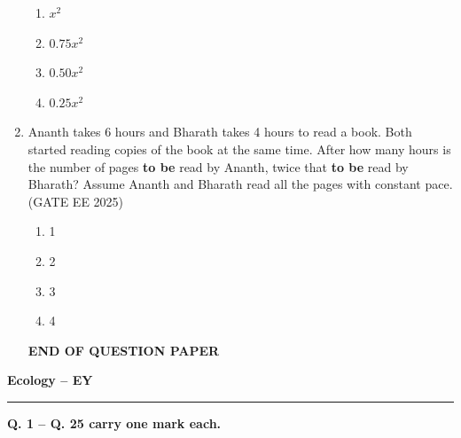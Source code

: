 \begin{enumerate}[leftmargin=*,label=\textbf{Q.\arabic*},resume]
\begin{multicols}{2}
\begin{enumerate}
\item $x^2$
\item $0.75 x^2$
\item $0.50 x^2$
\item $0.25 x^2$
\end{enumerate}
\end{multicols}

\item Ananth takes 6 hours and Bharath takes 4 hours to read a book. Both started reading copies of the book at the same time. After how many hours is the number of pages \textbf{to be} read by Ananth, twice that \textbf{to be} read by Bharath? Assume Ananth and Bharath read all the pages with constant pace.\hfill {(GATE EE 2025)}

\begin{multicols}{2}
\begin{enumerate}
\item 1
\item 2
\item 3
\item 4
\end{enumerate}
\end{multicols}
\begin{center}
  \textbf{END OF QUESTION PAPER}  
\end{center}

\end{enumerate}
\newpage
{}

\begin{center}
    {\Large \textbf{Ecology -- EY}}
\end{center}
\rule{\columnwidth}{0.4pt}


\noindent \textbf{Q. 1 -- Q. 25 carry one mark each.}

